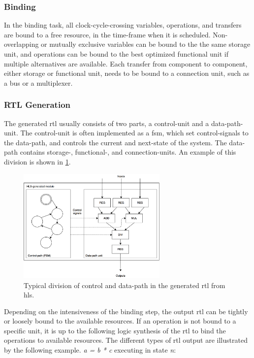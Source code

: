 \subsubsection{Binding}
In the binding task, all clock-cycle-crossing variables, operations, and transfers are bound to a free resource, in the time-frame when it is scheduled. Non-overlapping or mutually exclusive variables can be bound to the the same storage unit, and operations can be bound to the best optimized functional unit if multiple alternatives are available. Each transfer from component to component, either storage or functional unit, needs to be bound to a connection unit, such as a bus or a multiplexer.
\subsubsection{RTL Generation}
The generated \gls{rtl} usually consists of two parts, a control-unit and a data-path-unit. The control-unit is often implemented as a \gls{fsm}, which set control-signals to the data-path, and controls the current and next-state of the system. The data-path contains storage-, functional-, and connection-units. An example of this division is shown in \cref{fig:hlsrtl}.
\begin{figure}[hbpt]
\centering
\includegraphics[width=0.65\textwidth]{../figs/HLSRTL.png}
\caption{\label{fig:hlsrtl}Typical division of control and data-path in the generated \gls{rtl} from \gls{hls}.}
\end{figure}
Depending on the intensiveness of the binding step, the output \gls{rtl} can be tightly or loosely bound to the available resources. If an operation is not bound to a specific unit, it is up to the following logic synthesis of the \gls{rtl} to bind the operations to available resources. The different types of \gls{rtl} output are illustrated by the following example. \textit{a = b * c} executing in state \textit{n}:

